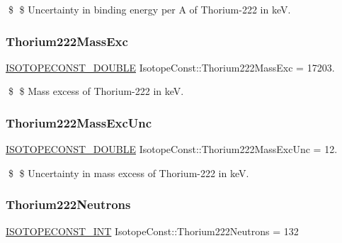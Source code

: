 \$ \$ Uncertainty in binding energy per A of Thorium-\/222 in keV. \mbox{\label{group___isotope_const-_thorium-_th222_ga5a7e465f2b2ad74711938283f7d415fa}} 
\subsubsection{\texorpdfstring{Thorium222\+Mass\+Exc}{Thorium222MassExc}}
{\footnotesize\ttfamily \mbox{\hyperlink{group___isotope_const-_macros_ga8f45a7272ce02c0b4c65c44636ed719a}{I\+S\+O\+T\+O\+P\+E\+C\+O\+N\+S\+T\+\_\+\+D\+O\+U\+B\+LE}} Isotope\+Const\+::\+Thorium222\+Mass\+Exc = 17203.}

\$ \$ Mass excess of Thorium-\/222 in keV. \mbox{\label{group___isotope_const-_thorium-_th222_ga5a1445b506beffa12f1105158c8a1e48}} 
\subsubsection{\texorpdfstring{Thorium222\+Mass\+Exc\+Unc}{Thorium222MassExcUnc}}
{\footnotesize\ttfamily \mbox{\hyperlink{group___isotope_const-_macros_ga8f45a7272ce02c0b4c65c44636ed719a}{I\+S\+O\+T\+O\+P\+E\+C\+O\+N\+S\+T\+\_\+\+D\+O\+U\+B\+LE}} Isotope\+Const\+::\+Thorium222\+Mass\+Exc\+Unc = 12.}

\$ \$ Uncertainty in mass excess of Thorium-\/222 in keV. \mbox{\label{group___isotope_const-_thorium-_th222_ga621b0e609516dd0380e581e531228f46}} 
\subsubsection{\texorpdfstring{Thorium222\+Neutrons}{Thorium222Neutrons}}
{\footnotesize\ttfamily \mbox{\hyperlink{group___isotope_const-_macros_ga5f18360b3e99483a35c32d789e62621c}{I\+S\+O\+T\+O\+P\+E\+C\+O\+N\+S\+T\+\_\+\+I\+NT}} Isotope\+Const\+::\+Thorium222\+Neutrons = 132}

